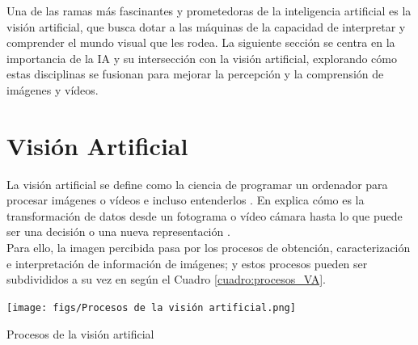 Una de las ramas más fascinantes y prometedoras de la inteligencia artificial es la visión artificial, que busca dotar a las máquinas de la capacidad de interpretar y comprender el mundo visual que les rodea. La siguiente sección se centra en la importancia de la IA y su intersección con la visión artificial, explorando cómo estas disciplinas se fusionan para mejorar la percepción y la comprensión de imágenes y vídeos.

\section{Visión Artificial}
\label{sec:VA} 

La visión artificial se define como la ciencia de programar un ordenador para procesar imágenes o vídeos e incluso entenderlos \cite{Culjak12}. En \cite{Bradski08} explica cómo es la transformación de datos desde un fotograma o vídeo cámara hasta lo que puede ser una decisión o una nueva representación \cite{Alvear17}. \\

Para ello, la imagen percibida pasa por los procesos de obtención, caracterización e interpretación de información de imágenes; y estos procesos pueden ser subdivididos a su vez en \cite{Santillan15} según el Cuadro \ref{cuadro:procesos_VA}.\\

\begin{table} [H]
  \begin{center}
      \texttt{[image: figs/Procesos de la visión artificial.png]}
  \end{center}
  \caption{Procesos de la visión artificial}
  \label{cuadro:procesos_VA}
\end{table}

